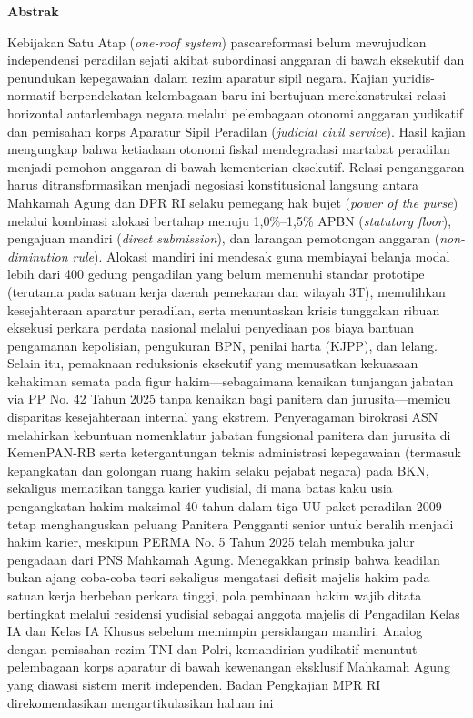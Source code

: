\documentclass[12pt,a4paper,twocolumn]{article}
\begin{document}
\begin{@twocolumnfalse}
\begin{center}
            \begin{minipage}{0.93\textwidth}
                \begin{center}
                    \textbf{\fontsize{10}{12}\selectfont Abstrak}
                \end{center}
                \vspace{-0.3em}
                \fontsize{9.5}{11.8}\selectfont
                Kebijakan Satu Atap (\textit{one-roof system}) pascareformasi belum mewujudkan independensi peradilan sejati akibat subordinasi anggaran di bawah eksekutif dan penundukan kepegawaian dalam rezim aparatur sipil negara. Kajian yuridis-normatif berpendekatan kelembagaan baru ini bertujuan merekonstruksi relasi horizontal antarlembaga negara melalui pelembagaan otonomi anggaran yudikatif dan pemisahan korps Aparatur Sipil Peradilan (\textit{judicial civil service}). Hasil kajian mengungkap bahwa ketiadaan otonomi fiskal mendegradasi martabat peradilan menjadi pemohon anggaran di bawah kementerian eksekutif. Relasi penganggaran harus ditransformasikan menjadi negosiasi konstitusional langsung antara Mahkamah Agung dan DPR RI selaku pemegang hak bujet (\textit{power of the purse}) melalui kombinasi alokasi bertahap menuju 1,0\%--1,5\% APBN (\textit{statutory floor}), pengajuan mandiri (\textit{direct submission}), dan larangan pemotongan anggaran (\textit{non-diminution rule}). Alokasi mandiri ini mendesak guna membiayai belanja modal lebih dari 400 gedung pengadilan yang belum memenuhi standar prototipe (terutama pada satuan kerja daerah pemekaran dan wilayah 3T), memulihkan kesejahteraan aparatur peradilan, serta menuntaskan krisis tunggakan ribuan eksekusi perkara perdata nasional melalui penyediaan pos biaya bantuan pengamanan kepolisian, pengukuran BPN, penilai harta (KJPP), dan lelang. Selain itu, pemaknaan reduksionis eksekutif yang memusatkan kekuasaan kehakiman semata pada figur hakim—sebagaimana kenaikan tunjangan jabatan via PP No. 42 Tahun 2025 tanpa kenaikan bagi panitera dan jurusita—memicu disparitas kesejahteraan internal yang ekstrem. Penyeragaman birokrasi ASN melahirkan kebuntuan nomenklatur jabatan fungsional panitera dan jurusita di KemenPAN-RB serta ketergantungan teknis administrasi kepegawaian (termasuk kepangkatan dan golongan ruang hakim selaku pejabat negara) pada BKN, sekaligus mematikan tangga karier yudisial, di mana batas kaku usia pengangkatan hakim maksimal 40 tahun dalam tiga UU paket peradilan 2009 tetap menghanguskan peluang Panitera Pengganti senior untuk beralih menjadi hakim karier, meskipun PERMA No. 5 Tahun 2025 telah membuka jalur pengadaan dari PNS Mahkamah Agung. Menegakkan prinsip bahwa keadilan bukan ajang coba-coba teori sekaligus mengatasi defisit majelis hakim pada satuan kerja berbeban perkara tinggi, pola pembinaan hakim wajib ditata bertingkat melalui residensi yudisial sebagai anggota majelis di Pengadilan Kelas IA dan Kelas IA Khusus sebelum memimpin persidangan mandiri. Analog dengan pemisahan rezim TNI dan Polri, kemandirian yudikatif menuntut pelembagaan korps aparatur di bawah kewenangan eksklusif Mahkamah Agung yang diawasi sistem merit independen. Badan Pengkajian MPR RI direkomendasikan mengartikulasikan haluan ini 
\end{minipage}
\end{center}
\end{@twocolumnfalse}
\end{document}
